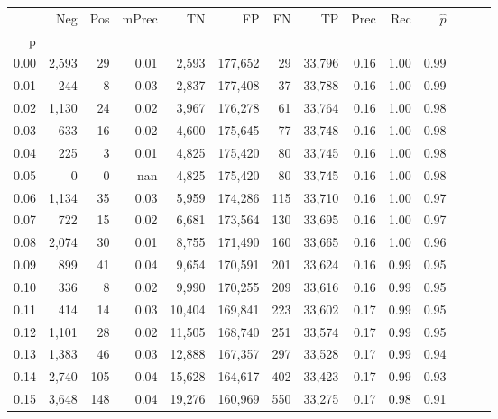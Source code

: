 \begin{tabular}{rrrrrrrrrrrrrr}
\toprule
{} &     Neg &    Pos & mPrec &       TN &       FP &      FN &      TP &  Prec &   Rec & $\hat{p}$ \\
p    &         &        &       &          &          &         &         &       &       &           \\
\midrule
0.00 &   2,593 &     29 &  0.01 &    2,593 &  177,652 &      29 &  33,796 &  0.16 &  1.00 &      0.99 \\
0.01 &     244 &      8 &  0.03 &    2,837 &  177,408 &      37 &  33,788 &  0.16 &  1.00 &      0.99 \\
0.02 &   1,130 &     24 &  0.02 &    3,967 &  176,278 &      61 &  33,764 &  0.16 &  1.00 &      0.98 \\
0.03 &     633 &     16 &  0.02 &    4,600 &  175,645 &      77 &  33,748 &  0.16 &  1.00 &      0.98 \\
0.04 &     225 &      3 &  0.01 &    4,825 &  175,420 &      80 &  33,745 &  0.16 &  1.00 &      0.98 \\
0.05 &       0 &      0 &   nan &    4,825 &  175,420 &      80 &  33,745 &  0.16 &  1.00 &      0.98 \\
0.06 &   1,134 &     35 &  0.03 &    5,959 &  174,286 &     115 &  33,710 &  0.16 &  1.00 &      0.97 \\
0.07 &     722 &     15 &  0.02 &    6,681 &  173,564 &     130 &  33,695 &  0.16 &  1.00 &      0.97 \\
0.08 &   2,074 &     30 &  0.01 &    8,755 &  171,490 &     160 &  33,665 &  0.16 &  1.00 &      0.96 \\
0.09 &     899 &     41 &  0.04 &    9,654 &  170,591 &     201 &  33,624 &  0.16 &  0.99 &      0.95 \\
0.10 &     336 &      8 &  0.02 &    9,990 &  170,255 &     209 &  33,616 &  0.16 &  0.99 &      0.95 \\
0.11 &     414 &     14 &  0.03 &   10,404 &  169,841 &     223 &  33,602 &  0.17 &  0.99 &      0.95 \\
0.12 &   1,101 &     28 &  0.02 &   11,505 &  168,740 &     251 &  33,574 &  0.17 &  0.99 &      0.95 \\
0.13 &   1,383 &     46 &  0.03 &   12,888 &  167,357 &     297 &  33,528 &  0.17 &  0.99 &      0.94 \\
0.14 &   2,740 &    105 &  0.04 &   15,628 &  164,617 &     402 &  33,423 &  0.17 &  0.99 &      0.93 \\
0.15 &   3,648 &    148 &  0.04 &   19,276 &  160,969 &     550 &  33,275 &  0.17 &  0.98 &      0.91 \\

\end{tabular}
